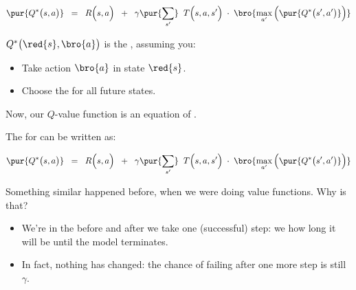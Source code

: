         \begin{equation}
            \pur{Q^*\big(s,a \big)} \;\;=\;\; 
                    R \Big( s,a \Big)
                \;\;+\;\;
                \gamma
                \pur{\sum_{s'}}  
                    \;\;
                    T \Big(          s,a,s' \Big)
                    \;\cdot\; 
                    \bro{ \max_{a'} \Big( \pur{Q^*\big(s',a' \big)} \Big)}
        \end{equation}

        \begin{definition}
            $Q^*\big(\red{s},\bro{a} \big)$ is the , assuming you:

            \begin{itemize}
                \item Take action $\bro{a}$ in state $\red{s}$.
                \item Choose the  for all future states.
            \end{itemize}
        \end{definition}

        
    
        

        Now, our $Q$-value function is an equation of .\\

        \begin{kequation}
            The  for  can be written as:

            \begin{equation*}
                \pur{Q^*\big(s,a \big)} \;\;=\;\; 
                    R \Big( s,a \Big)
                \;\;+\;\;
                \gamma
                \pur{\sum_{s'}}  
                    \;\;
                    T \Big(          s,a,s' \Big)
                    \;\cdot\; 
                    \bro{ \max_{a'} \Big( \pur{Q^*\big(s',a' \big)} \Big)}
            \end{equation*}
        \end{kequation}

        Something similar happened before, when we were doing value functions. Why is that?

        \begin{itemize}
            \item We're in the  before and after we take one (successful) step: we  how long it will be until the model terminates.
            \item In fact, nothing has changed: the chance of failing after one more step is still $\gamma$.
        \end{itemize}

